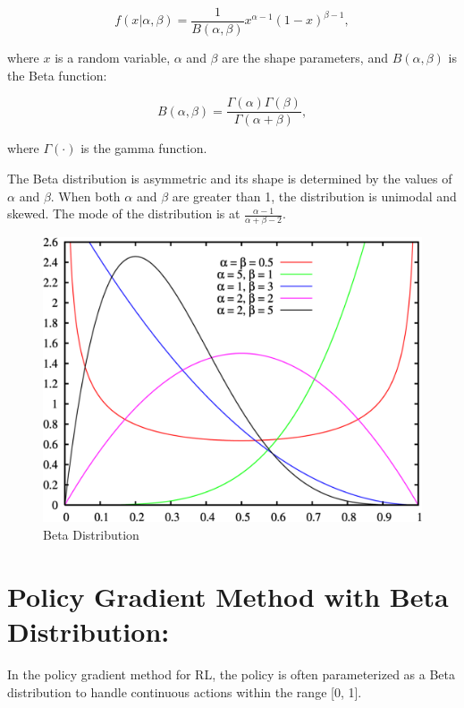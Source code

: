 \begin{equation}
    f(x | \alpha, \beta) = \frac{1}{B(\alpha, \beta)} x^{\alpha - 1}(1 - x)^{\beta - 1},\label{eq:equation4}
\end{equation}

where $x$ is a random variable, $\alpha$ and $\beta$ are the shape parameters, and $B(\alpha, \beta)$ is the Beta function:

\begin{equation}
    B(\alpha, \beta) = \frac{\Gamma(\alpha) \Gamma(\beta)}{\Gamma(\alpha + \beta)},\label{eq:equation3}
\end{equation}

where $\Gamma(\cdot)$ is the gamma function.

The Beta distribution is asymmetric and its shape is determined by the values of $\alpha$ and $\beta$. When both $\alpha$ and $\beta$ are greater than 1, the distribution is unimodal and skewed.
The mode of the distribution is at $\frac{\alpha - 1}{\alpha + \beta - 2}$.

\begin{figure}[h!]
    \centering
    \includegraphics[width=12cm]{assets/beta}
    \caption{Beta Distribution}\label{fig:beta-distribution}
\end{figure}

\section{Policy Gradient Method with Beta Distribution:}\label{sec:policy-gradient-method-with-beta-distribution:}
In the policy gradient method for RL, the policy is often parameterized as a Beta distribution to handle continuous actions within the range [0, 1].

